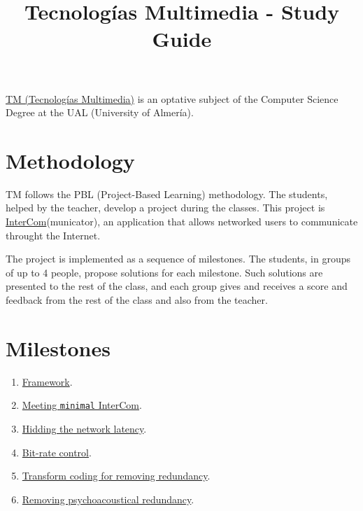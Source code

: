 \title{Tecnologías Multimedia - Study Guide}

\maketitle

\href{https://www.ual.es/estudios/grados/presentacion/plandeestudios/asignatura/4015/40154321}{TM
  (Tecnologías Multimedia)} is an optative subject of the Computer
Science Degree at the UAL (University of Almería).

\section{Methodology}
TM follows the PBL (Project-Based Learning) methodology. The students,
helped by the teacher, develop a project during the classes. This
project
is \href{https://github.com/Tecnologias-multimedia/intercom}{InterCom}(municator),
an application that allows networked users to communicate throught
the Internet.

The project is implemented as a sequence of milestones. The students,
in groups of up to 4 people, propose solutions for each
milestone. Such solutions are presented to the rest of the class, and
each group gives and receives a score and feedback from the rest of
the class and also from the teacher.

\section{Milestones}

\begin{enumerate}
\item \href{https://tecnologias-multimedia.github.io/study_guide/framework/}{Framework}.
\item \href{https://tecnologias-multimedia.github.io/study_guide/minimal/}{Meeting \texttt{minimal} InterCom}.
\item \href{https://tecnologias-multimedia.github.io/study_guide/latency/}{Hidding the network latency}.
\item \href{https://tecnologias-multimedia.github.io/study_guide/BR_control/}{Bit-rate control}.
\item \href{https://tecnologias-multimedia.github.io/study_guide/transform_coding/}{Transform coding for removing redundancy}.
\item \href{https://tecnologias-multimedia.github.io/study_guide/perceptual_coding/}{Removing psychoacoustical redundancy}.
\end{enumerate}

